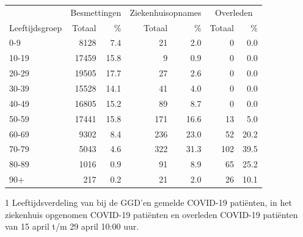 \documentclass[
  english,
  man,floatsintext]{apa6}
\begin{document}
\begin{table}
\centering\begingroup\fontsize{11}{13}\selectfont

\begin{threeparttable}
\begin{tabular}{lrrrrrr}
\toprule
\multicolumn{1}{c}{ } & \multicolumn{2}{c}{Besmettingen} & \multicolumn{2}{c}{Ziekenhuisopnames} & \multicolumn{2}{c}{Overleden} \\
\cmidrule(l{3pt}r{3pt}){2-3} \cmidrule(l{3pt}r{3pt}){4-5} \cmidrule(l{3pt}r{3pt}){6-7}
Leeftijdsgroep & Totaal & \% & Totaal & \% & Totaal & \%\\
\midrule
0-9 & 8128 & 7.4 & 21 & 2.0 & 0 & 0.0\\
10-19 & 17459 & 15.8 & 9 & 0.9 & 0 & 0.0\\
20-29 & 19505 & 17.7 & 27 & 2.6 & 0 & 0.0\\
30-39 & 15528 & 14.1 & 41 & 4.0 & 0 & 0.0\\
40-49 & 16805 & 15.2 & 89 & 8.7 & 0 & 0.0\\
50-59 & 17441 & 15.8 & 171 & 16.6 & 13 & 5.0\\
60-69 & 9302 & 8.4 & 236 & 23.0 & 52 & 20.2\\
70-79 & 5043 & 4.6 & 322 & 31.3 & 102 & 39.5\\
80-89 & 1016 & 0.9 & 91 & 8.9 & 65 & 25.2\\
90+ & 217 & 0.2 & 21 & 2.0 & 26 & 10.1\\
\bottomrule
\end{tabular}
\begin{tablenotes}
\item[1] Leeftijdsverdeling van bij de GGD’en gemelde COVID-19 patiënten, in het ziekenhuis opgenomen COVID-19 patiënten en overleden COVID-19 patiënten van 15 april t/m 29 april 10:00 uur.
\end{tablenotes}
\end{threeparttable}
\endgroup{}
\end{table}

\newpage
\end{document}
